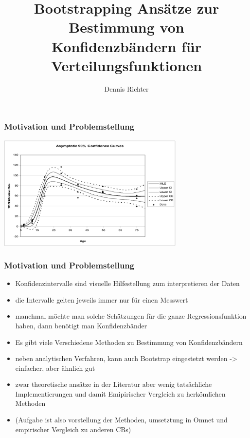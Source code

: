 \documentclass[aspectratio=1610, 9pt]{beamer}
\title{Bootstrapping Ansätze zur Bestimmung von Konfidenzbändern für Verteilungsfunktionen}
\author[D.~Richter]{Dennis Richter}
\institute[LS 4]{Lehrstuhl IV \\ Informatik}
\begin{document}
\maketitle

\begin{frame}
  \frametitle{Motivation und Problemstellung}
  \begin{center}
    \includegraphics[width=0.7\textwidth]{images/4.png}
  \end{center}
\end{frame}

\begin{frame}
  \frametitle{Motivation und Problemstellung}
  \begin{itemize}
    \item Konfidenzintervalle sind visuelle Hilfestellung zum interpretieren der Daten
    \item die Intervalle gelten jeweils immer nur für einen Messwert
    \item manchmal möchte man solche Schätzungen für die ganze Regressionsfunktion haben, dann benötigt man Konfidenzbänder
    \item Es gibt viele Verschiedene Methoden zu Bestimmung von Konfidenzbändern
    \item neben analytischen Verfahren, kann auch Bootstrap eingestetzt werden -> einfacher, aber ähnlich gut
    \item zwar theoretische ansätze in der Literatur aber wenig tatsächliche Implementierungen und damit Emipirischer Vergleich zu herkömlichen Methoden
    \item (Aufgabe ist also vorstellung der Methoden, umsetztung in Omnet und empirischer Vergleich zu anderen CBs)
  \end{itemize}
\end{frame}

\end{document}
